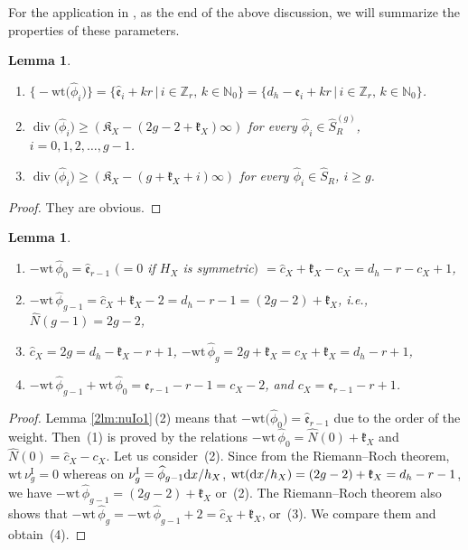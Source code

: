\documentclass[pdftex]{sigma}
\def\ZZ{{\mathbb Z}}
\def\NN{{\mathbb N}}
\def\fK{{\mathfrak K}}
\def\fe{{\mathfrak e}}
\def\fk{{\mathfrak k}}
\def\hc{{\widehat c}}
\def\hN{{\widehat N}}
\def\hS{{\widehat S}}
\def\hfe{{\widehat{\mathfrak e}}}
\def\hphi{{\widehat \phi}}
\def\Div{\operatorname{div}}
\def\wt{{\mathrm {wt}}}
\def\nuI#1{{\nu^{\mathrm{I}}_{#1}}}
\numberwithin{equation}{section}
\newtheorem{Lemma}[Theorem]{Lemma}
\begin{document}
For the application in \cite{KMP2022b}, as the end of the above discussion, we will summarize the properties of these parameters.

\begin{Lemma}\label{2lm:nuIo1_2}\quad
\begin{enumerate}\itemsep=0pt
\item[$1.$] $\big\{{-}\wt\big(\hphi_i\big)\big\}=\{\hfe_i + k r\, |\,i \in \ZZ_r,\, k \in \NN_0\}=\{d_h - \fe_i + k r\, |\,i \in \ZZ_r,\, k \in \NN_0\}$.

\item[$2.$] $\Div\big(\hphi_i\big)\ge(\fK_X-(2g-2+\fk_X)\infty)$ for every $\hphi_i
\in \hS_R^{(g)}$, $i=0, 1, 2,\dots,g-1$.

\item[$3.$] $\Div\big(\hphi_i\big)\ge(\fK_X-(g+\fk_X+i)\infty)$ for every $\hphi_i \in \hS_R$, $i\ge g$.
\end{enumerate}
\end{Lemma}

\begin{proof}They are obvious.
\end{proof}

\begin{Lemma}\label{2lm:nuIo2}\quad
\begin{enumerate}\itemsep=0pt
\item[$(1)$] $-\wt\, \hphi_{0}= \hfe_{r-1}$ $(=0$ if $H_X$ is symmetric$)$
$= \hc_X+\fk_X-c_X =d_h - r-c_X+1$,

\item[$(2)$] $-\wt\, \hphi_{g-1}= \hc_X+\fk_X-2= d_h - r- 1=
(2g-2)+\fk_X$, i.e., $\hN(g-1) = 2g-2$,

\item[$(3)$] $ \hc_X = 2g=d_h -\fk_X-r+1$,
$-\wt\, \hphi_{g}=2g+\fk_X=\hc_X+\fk_X=d_h - r+1$,

\item[$(4)$] $-\wt\, \hphi_{g-1}+\wt\, \hphi_{0}=\fe_{r-1}-r-1= c_X-2$, and
$c_X= \fe_{r-1} - r+1$.

\end{enumerate}
\end{Lemma}

\begin{proof}
Lemma \ref{2lm:nuIo1}\,(2) means that $-\wt\big(\hphi_{0}\big)=\hfe_{r-1}$ due to
the order of the weight.
Then~(1) is proved by the relations $-\wt\, \hphi_{0}=\hN(0)+\fk_X$ and $\hN(0) = \hc_X-c_X$.
Let us consider~(2). Since from the Riemann--Roch theorem, $\wt \, \nuI{g} = 0$ whereas on $\nuI{g}=\hphi_{g-1}{\rm d} x/h_X$, $\wt({\rm d} x/h_X)=(2g-2)+\fk_X=d_h - r-1$, we have $-\wt\, \hphi_{g-1}=(2g-2)+\fk_X$ or~(2).
The Riemann--Roch theorem also shows that $-\wt\, \hphi_{g}=-\wt\, \hphi_{g-1}+2 = \hc_X +\fk_X$, or~(3).
We compare them and obtain~(4).
\end{proof}
\end{document}
